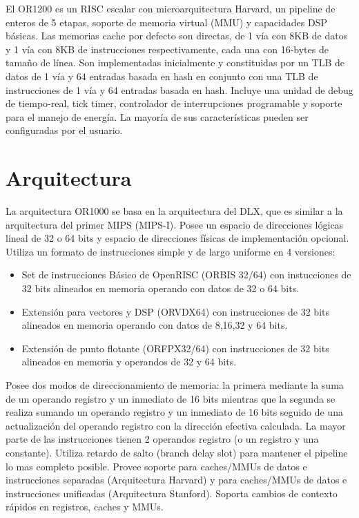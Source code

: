\documentclass[a4paper,11pt]{article}
\begin{document}
	El OR1200 es un RISC escalar con microarquitectura Harvard, un pipeline de enteros de 5 etapas, soporte de memoria virtual (MMU) y capacidades DSP
	básicas. Las memorias cache por defecto son directas, de 1 vía con 8KB de datos y 1 vía con 8KB de instrucciones respectivamente, cada  una con
	16-bytes de tamaño de línea. Son implementadas inicialmente y constituidas por un TLB de datos de 1 vía y 64 entradas basada en hash en conjunto con
	una TLB de instrucciones de 1 vía y 64 entradas basada en hash. Incluye una unidad de debug de tiempo-real, tick timer, controlador de interrupciones
	programable y soporte para el manejo de energía. La mayoría de sus características pueden ser configuradas por el usuario.
		
	\section{Arquitectura}
	
	La arquitectura OR1000 se basa en la arquitectura del DLX, que es similar a la arquitectura del primer MIPS (MIPS-I). Posee un espacio de direcciones
	lógicas lineal de 32 o 64 bits y espacio de direcciones físicas de implementación opcional. Utiliza un formato de instrucciones simple y de largo
	uniforme en 4 versiones:
	
	\begin{itemize}
	  \item  Set de instrucciones Básico de OpenRISC (ORBIS 32/64) con instucciones de 32 bits alineados en memoria operando con datos de 32 o 64
	  bits.
	  \item Extensión para vectores y DSP (ORVDX64) con instrucciones de 32 bits alineados en memoria operando con datos de 8,16,32 y 64 bits.
	  \item Extensión de punto flotante (ORFPX32/64) con instrucciones de 32 bits alineados en memoria y operandos de 32 y 64 bits.  
	\end{itemize}
	
	Posee dos modos de direccionamiento de memoria: la primera mediante la suma de un operando registro y un inmediato de 16 bits mientras que la segunda
	se realiza sumando un operando registro y un inmediato de 16 bits seguido de una actualización del operando registro con la dirección efectiva
	calculada. La mayor parte de las instrucciones tienen 2 operandos registro (o un registro y una constante). Utiliza retardo de salto (branch delay
	slot) para mantener el pipeline lo mas completo posible. Provee soporte para caches/MMUs de datos e instrucciones separadas (Arquitectura Harvard) y
	para caches/MMUs de datos e instrucciones unificadas (Arquitectura Stanford). Soporta cambios de contexto rápidos en registros, caches y MMUs.
	  
\end{document}
